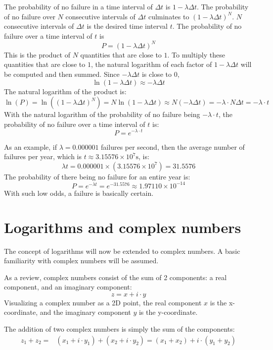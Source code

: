 \documentclass{article}
\begin{document}
\begin{description}
The probability of no failure in a time interval of \(\Delta t\) is \(1 - \lambda\Delta t\). The probability of no failure over \(N\) consecutive intervals of \(\Delta t\) culminates to \((1 - \lambda\Delta t)^N\). \(N\) consecutive intervals of \(\Delta t\) is the desired time interval \(t\). The probability of no failure over a time interval of \(t\) is 
\[P = (1 - \lambda\Delta t)^N\]  
This is the product of \(N\) quantities that are close to \(1\). To multiply these quantities that are close to \(1\), the natural logarithm of each factor of \(1 - \lambda\Delta t\) will be computed and then summed. Since \(-\lambda\Delta t\) is close to \(0\),
\[\ln(1 - \lambda\Delta t) \approx -\lambda \Delta t\]
The natural logarithm of the product is:
\[\ln(P) = \ln((1 - \lambda\Delta t)^N) = N\ln(1 - \lambda\Delta t) \approx N(-\lambda \Delta t) = -\lambda \cdot N\Delta t = -\lambda \cdot t\]
With the natural logarithm of the probability of no failure being \(-\lambda \cdot t\), the probability of no failure over a time interval of \(t\) is:
\[P = e^{-\lambda \cdot t}\] 

As an example, if \(\lambda = 0.000001\) failures per second, then the average number of failures per year, which is \(t \approx 3.15576 \times 10^7\text{s}\), is:  
\[\lambda t = 0.000001 \times (3.15576 \times 10^7) = 31.5576\]  
The probability of there being no failure for an entire year is: 
\[P = e^{-\lambda t} = e^{-31.5576} \approx 1.97110 \times 10^{-14}\]
With such low odds, a failure is basically certain. 


\end{description}




\section*{Logarithms and complex numbers}

The concept of logarithms will now be extended to complex numbers. A basic familiarity with complex numbers will be assumed.

As a review, complex numbers consist of the sum of 2 components: a real component, and an imaginary component: 
\[z = x + i \cdot y\]
Visualizing a complex number as a 2D point, the real component \(x\) is the x-coordinate, and the imaginary component \(y\) is the y-coordinate. 

The addition of two complex numbers is simply the sum of the components: 
\begin{align*} 
z_1 + z_2 
= & (x_1 + i \cdot y_1) + (x_2 + i \cdot y_2)  
= (x_1 + x_2) + i \cdot (y_1 + y_2)
\end{align*} 
   
\end{document}
